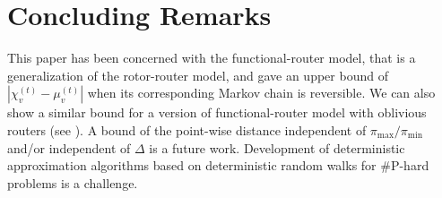 \documentclass[letter, 11pt]{article}
\newcommand{\1}{\mbox{1}\hspace{-0.25em}\mbox{l}}
\begin{document}
\section{Concluding Remarks}
 This paper has been concerned with the functional-router model, 
   that is a generalization of the rotor-router model, and 
   gave an upper bound of $|\chi^{(t)}_v - \mu^{(t)}_v|$ 
   when its corresponding Markov chain is reversible. 
 We can also show a similar bound 
  for a version of functional-router model 
  with oblivious routers (see \cite{shiraga}). 
A bound of the point-wise distance 
   independent of $\pi_{\max}/\pi_{\min}$ and/or independent of $\Delta$ 
  is a future work. 
Development of deterministic approximation algorithms 
  based on deterministic random walks for {\#}P-hard problems is a challenge. 



\end{document}
